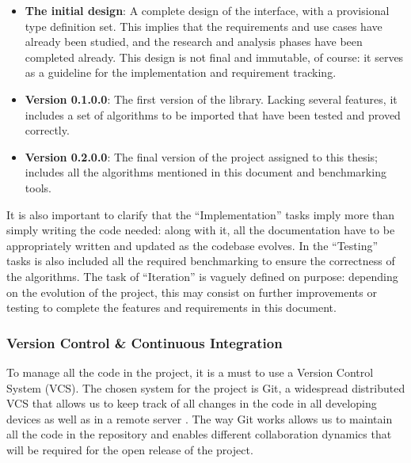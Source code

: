 \begin{itemize}
\item \textbf{The initial design}: A complete design of the interface, with a
  provisional type definition set. This implies that the requirements and use
  cases have already been studied, and the research and analysis phases have
  been completed already. This design is not final and immutable, of course:
  it serves as a guideline for the implementation and requirement tracking.
\item \textbf{Version 0.1.0.0}: The first version of the library. Lacking
  several features, it includes a set of algorithms to be imported that have
  been tested and proved correctly.
\item \textbf{Version 0.2.0.0}: The final version of the project assigned to
  this thesis; includes all the algorithms mentioned in this document and
  benchmarking tools.
\end{itemize}

It is also important to clarify that the ``Implementation'' tasks imply more
than simply writing the code needed: along with it, all the documentation have
to be appropriately written and updated as the codebase evolves. In the
``Testing'' tasks is also included all the required benchmarking to ensure the
correctness of the algorithms. The task of ``Iteration'' is vaguely defined on
purpose: depending on the evolution of the project, this may consist on further
improvements or testing to complete the features and requirements in this
document.\\

\subsubsection{Version Control \& Continuous Integration}

To manage all the code in the project, it is a must to use a Version Control
System (VCS). The chosen system for the project is Git, a widespread
distributed VCS that allows us to keep track of all changes in the code in all
developing devices as well as in a remote server \cite{chacon-2009-git}. The
way Git works allows us to maintain all the code in the repository and enables
different collaboration dynamics that will be required for the open release of
the project.\\

